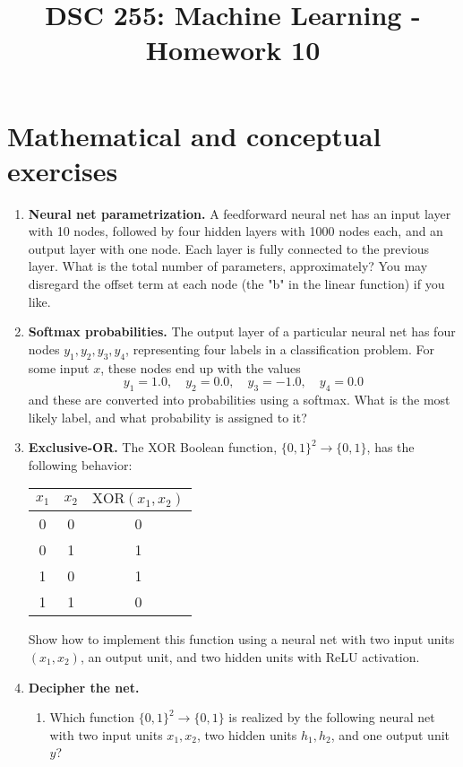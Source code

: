 \documentclass{article}
\title{DSC 255: Machine Learning - Homework 10}
\author{}
\date{}
\begin{document}
\maketitle

\section*{Mathematical and conceptual exercises}

\begin{enumerate}
    \item \textbf{Neural net parametrization.} A feedforward neural net has an input layer with 10 nodes, followed by four hidden layers with 1000 nodes each, and an output layer with one node. Each layer is fully connected to the previous layer. What is the total number of parameters, approximately? You may disregard the offset term at each node (the "b" in the linear function) if you like.

    \item \textbf{Softmax probabilities.} The output layer of a particular neural net has four nodes $y_{1}, y_{2}, y_{3}, y_{4}$, representing four labels in a classification problem. For some input $x$, these nodes end up with the values
    \[
    y_{1}=1.0, \quad y_{2}=0.0, \quad y_{3}=-1.0, \quad y_{4}=0.0
    \]
    and these are converted into probabilities using a softmax. What is the most likely label, and what probability is assigned to it?

    \item \textbf{Exclusive-OR.} The XOR Boolean function, $\{0,1\}^{2} \rightarrow \{0,1\}$, has the following behavior:

    \begin{tabular}{|c|c|c|}
    \hline
    $x_{1}$ & $x_{2}$ & $\text{XOR}(x_{1}, x_{2})$ \\
    \hline
    0 & 0 & 0 \\
    0 & 1 & 1 \\
    1 & 0 & 1 \\
    1 & 1 & 0 \\
    \hline
    \end{tabular}

    Show how to implement this function using a neural net with two input units $(x_{1}, x_{2})$, an output unit, and two hidden units with ReLU activation.

    \item \textbf{Decipher the net.}
    \begin{enumerate}
        \item Which function $\{0,1\}^{2} \rightarrow \{0,1\}$ is realized by the following neural net with two input units $x_{1}, x_{2}$, two hidden units $h_{1}, h_{2}$, and one output unit $y$?


\end{enumerate}
\end{enumerate}
\end{document}
